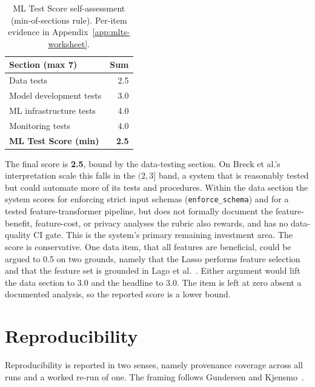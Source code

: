\begin{table}[h]
  \centering
  \caption{ML Test Score self-assessment (min-of-sections rule). Per-item evidence in Appendix~\ref{app:mlts-worksheet}.}
  \label{tab:res-mlts}
  \renewcommand{\arraystretch}{1.3}
  \begin{tabularx}{\linewidth}{@{}>{\raggedright\arraybackslash}X r@{}}
    \toprule
    \textbf{Section (max 7)} & \textbf{Sum} \\
    \midrule
    Data tests                 & 2.5 \\
    Model development tests     & 3.0 \\
    ML infrastructure tests     & 4.0 \\
    Monitoring tests            & 4.0 \\
    \midrule
    \textbf{ML Test Score (min)} & \textbf{2.5} \\
    \bottomrule
  \end{tabularx}
\end{table}

The final score is \textbf{2.5}, bound by the data-testing section. On Breck et
al.'s interpretation scale this falls in the $(2,3]$ band, a system that is
reasonably tested but could automate more of its tests and procedures. Within
the data section the system scores for enforcing strict input schemas
(\texttt{enforce\_schema}) and for a tested feature-transformer pipeline, but
does not formally document the
feature-benefit, feature-cost, or privacy analyses the rubric also rewards, and
has no data-quality CI gate. This is the system's primary remaining
investment area. The score is conservative. One data item, that all features are beneficial,
could be argued to 0.5 on two grounds, namely that the Lasso performs feature
selection and that the feature set is grounded in Lago et al.~\cite{lago2021}.
Either argument would lift the data section to 3.0 and the headline to 3.0. The
item is left at zero absent a documented analysis, so the reported score is a
lower bound.

\section{Reproducibility}
\label{sec:res-repro}

Reproducibility is reported in two senses, namely provenance coverage across all
runs and a worked re-run of one. The framing follows Gundersen and
Kjensmo~\cite{gundersen2018reproducibility}.


